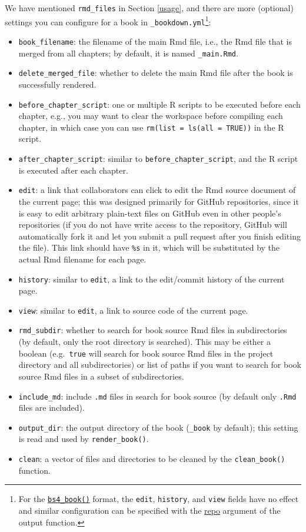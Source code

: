 \documentclass[
  12pt,
]{krantz}
\providecommand{\tightlist}{%
  \setlength{\itemsep}{0pt}\setlength{\parskip}{0pt}}
\theoremstyle{definition}
\theoremstyle{definition}
\theoremstyle{definition}
\theoremstyle{definition}
\theoremstyle{remark}
\begin{document}
We have mentioned \texttt{rmd\_files} in Section \ref{usage}, and there are more (optional) settings you can configure for a book in \texttt{\_bookdown.yml}\footnote{For the \hyperref[bs4-book]{\texttt{bs4\_book()}} format, the \texttt{edit}, \texttt{history}, and \texttt{view} fields have no effect and similar configuration can be specified with the \hyperref[specifying-the-repository]{repo} argument of the output function.}:

\begin{itemize}
\tightlist
\item
  \texttt{book\_filename}: the filename of the main Rmd file, i.e., the Rmd file that is merged from all chapters; by default, it is named \texttt{\_main.Rmd}.
\item
  \texttt{delete\_merged\_file}: whether to delete the main Rmd file after the book is successfully rendered.
\item
  \texttt{before\_chapter\_script}: one or multiple R scripts to be executed before each chapter, e.g., you may want to clear the workspace before compiling each chapter, in which case you can use \texttt{rm(list\ =\ ls(all\ =\ TRUE))} in the R script.
\item
  \texttt{after\_chapter\_script}: similar to \texttt{before\_chapter\_script}, and the R script is executed after each chapter.
\item
  \texttt{edit}: a link that collaborators can click to edit the Rmd source document of the current page; this was designed primarily for GitHub repositories, since it is easy to edit arbitrary plain-text files on GitHub even in other people's repositories (if you do not have write access to the repository, GitHub will automatically fork it and let you submit a pull request after you finish editing the file). This link should have \texttt{\%s} in it, which will be substituted by the actual Rmd filename for each page.
\item
  \texttt{history}: similar to \texttt{edit}, a link to the edit/commit history of the current page.
\item
  \texttt{view}: similar to \texttt{edit}, a link to source code of the current page.
\item
  \texttt{rmd\_subdir}: whether to search for book source Rmd files in subdirectories (by default, only the root directory is searched). This may be either a boolean (e.g.~\texttt{true} will search for book source Rmd files in the project directory and all subdirectories) or list of paths if you want to search for book source Rmd files in a subset of subdirectories.
\item
  \texttt{include\_md}: include \texttt{.md} files in search for book source (by default only \texttt{.Rmd} files are included).
\item
  \texttt{output\_dir}: the output directory of the book (\texttt{\_book} by default); this setting is read and used by \texttt{render\_book()}.
\item
  \texttt{clean}: a vector of files and directories to be cleaned by the \texttt{clean\_book()} function.
\end{itemize}
\end{document}
